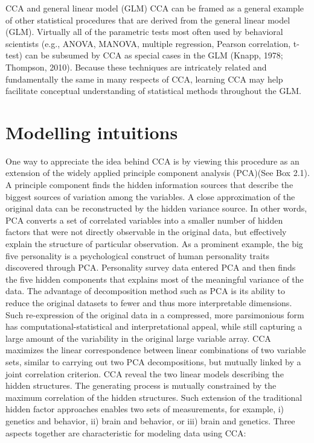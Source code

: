 \newpage
\begin{infobox}{CCA and general linear model (GLM)}
CCA can be framed as a general example of other statistical procedures that are derived from the general linear model (GLM). Virtually all of the parametric tests most often used by behavioral scientists (e.g., ANOVA, MANOVA, multiple regression, Pearson correlation, t-test) can be subsumed by CCA as special cases in the GLM (Knapp, 1978; Thompson, 2010). Because these techniques are intricately related and fundamentally the same in many respects of CCA, learning CCA may help facilitate conceptual understanding of statistical methods throughout the GLM.
\end{infobox}

\section{Modelling intuitions}
\label{ch:methods:intuitions}
One way to appreciate the idea behind CCA is by viewing this procedure as an extension of the widely applied principle component analysis (PCA)(See Box 2.1). A principle component finds the hidden information sources that describe the biggest sources of variation among the variables. A close approximation of the original data can be reconstructed by the hidden variance source. In other words, PCA converts a set of correlated variables into a smaller number of hidden factors that were not directly observable in the original data, but effectively explain the structure of particular observation. As a prominent example, the big five personality is a psychological construct of human personality traits discovered through PCA. Personality survey data entered PCA and then finds the five hidden components that explains most of the meaningful variance of the data. The advantage of decomposition method such as PCA is its ability to reduce the original datasets to fewer and thus more interpretable dimensions. Such re-expression of the original data in a compressed, more parsimonious form has computational-statistical and interpretational appeal, while still capturing a large amount of the variability in the original large variable array. CCA maximizes the linear correspondence between linear combinations of two variable sets, similar to carrying out two PCA decompositions, but mutually linked by a joint correlation criterion. CCA reveal the two linear models describing the hidden structures. The generating process is mutually constrained by the maximum correlation of the hidden structures. Such extension of the traditional hidden factor approaches enables two sets of measurements, for example, i) genetics and behavior, ii) brain and behavior, or iii) brain and genetics. Three aspects together are characteristic for modeling data using CCA:


